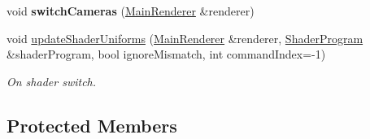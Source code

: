 \begin{Indent}
\begin{DoxyCompactItemize}
void {\bfseries switch\+Cameras} (\mbox{\hyperlink{classrev_1_1_main_renderer}{Main\+Renderer}} \&renderer)
\item 
void \mbox{\hyperlink{classrev_1_1_draw_command_afecf1ad28081f50019326cdf97cd6b28}{update\+Shader\+Uniforms}} (\mbox{\hyperlink{classrev_1_1_main_renderer}{Main\+Renderer}} \&renderer, \mbox{\hyperlink{classrev_1_1_shader_program}{Shader\+Program}} \&shader\+Program, bool ignore\+Mismatch, int command\+Index=-\/1)
\begin{DoxyCompactList}\small\item\em On shader switch. \end{DoxyCompactList}\end{DoxyCompactItemize}
\end{Indent}
\subsection*{Protected Members}
